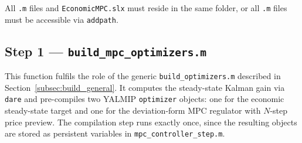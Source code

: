 All \texttt{.m} files and \texttt{EconomicMPC.slx} must reside in the
same folder, or all \texttt{.m} files must be accessible via
\texttt{addpath}.

\subsection{Step 1 — \texttt{build\_mpc\_optimizers.m}}
\label{subsec:build}

This function fulfils the role of the generic \texttt{build\_optimizers.m}
described in Section~\ref{subsec:build_general}.  It computes the
steady-state Kalman gain via \texttt{dare} and pre-compiles two YALMIP
\texttt{optimizer} objects: one for the economic steady-state target
and one for the deviation-form MPC regulator with $N$-step price
preview.  The compilation step runs exactly once, since the resulting
objects are stored as persistent variables in
\texttt{mpc\_controller\_step.m}.

